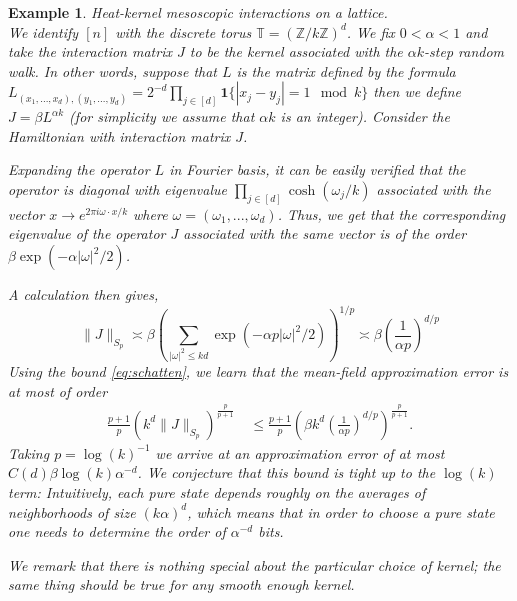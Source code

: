\documentclass[12pt]{article}
\def \ZZ {\mathbb Z}
\newtheorem{example}{Example}
\theoremstyle{definition}
\theoremstyle{remark}
\begin{document}
\begin{example} \emph{Heat-kernel mesoscopic interactions on a lattice.} \\
We identify $[n]$ with the discrete torus $\mathbb{T} = \left (\ZZ / k \ZZ \right )^d$. We fix $0 < \alpha < 1$ and take the interaction matrix $J$ to be the kernel associated with the $\alpha k$-step random walk. In other words, suppose that $L$ is the matrix defined by the formula $L_{(x_1,...,x_d),(y_1,...,y_d)} = 2^{-d} \prod_{j \in [d]} \mathbf{1} \{|x_j - y_j| = 1 \mod k\}$ then we define $J = \beta L^{\alpha k}$ (for simplicity we assume that $\alpha k$ is an integer). Consider the Hamiltonian with interaction matrix $J$.

Expanding the operator $L$ in Fourier basis, it can be easily verified that the operator is diagonal with eigenvalue $\prod_{j \in [d]} \cosh(\omega_j / k)$ associated with the vector $x \to e^{2 \pi i \omega \cdot x / k }$ where $\omega = (\omega_1, ..., \omega_d)$. Thus, we get that the corresponding eigenvalue of the operator $J$ associated with the same vector is of the order $\beta \exp(-\alpha |\omega|^2 / 2)$.

A calculation then gives,
$$
\| J \|_{S_p} \asymp \beta \left ( \sum_{|\omega|^2 \leq kd} \exp(-\alpha p |\omega|^2 / 2) \right )^{1/p} \asymp  \beta \left ( \frac{1}{\alpha p} \right )^{d/p}
$$
Using the bound \eqref{eq:schatten}, we learn that the mean-field approximation error is at most of order
\begin{align*}
\frac{p + 1}{p} \left ( k^d \|J\|_{S_p} \right )^{\frac{p}{p+1}} ~& \leq  \frac{p + 1}{p} \left ( \beta k^d \left ( \frac{1}{\alpha p} \right )^{d/p} \right )^{\frac{p}{p+1}}.
\end{align*} 
Taking $p = \log(k)^{-1}$ we arrive at an approximation error of at most $C(d) \beta \log(k) \alpha^{-d}$. We conjecture that this bound is tight up to the $\log(k)$ term: Intuitively, each pure state depends roughly on the averages of neighborhoods of size $(k \alpha)^d$, which means that in order to choose a pure state one needs to determine the order of $\alpha^{-d}$ bits. 

We remark that there is nothing special about the particular choice of kernel; the same thing should be true for any smooth enough kernel.
\end{example}
\end{document}
